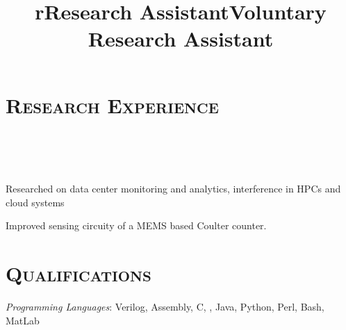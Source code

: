 \begin{resume}
	
	
	\section{\textsc{Research Experience}}
	
	\begin{formatb}
		\title{r}\\
		\\
		\body\\
	\end{formatb}
	
	\title{Research Assistant}
	\begin{position}
		Researched on data center monitoring and analytics, interference in HPCs and
    cloud systems 
	\end{position}
	
	\title{Voluntary Research Assistant}
	\begin{position}
		Improved sensing circuity of a MEMS based Coulter counter. 
	\end{position}
	
	\section{\textsc{Qualifications}}
	
	\emph{Programming Languages}: Verilog, Assembly, C, \Cplusplus, Java, Python,
	Perl, Bash, MatLab
	\setlength{\parskip}{1mm}
	
	

\end{resume}

